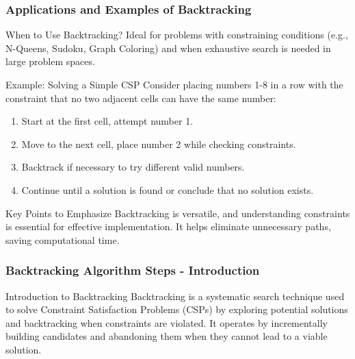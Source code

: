 \documentclass[aspectratio=169]{beamer}
\begin{document}
\begin{frame}[fragile]
    \frametitle{Applications and Examples of Backtracking}
    \begin{block}{When to Use Backtracking?}
        Ideal for problems with constraining conditions (e.g., N-Queens, Sudoku, Graph Coloring) and when exhaustive search is needed in large problem spaces.
    \end{block}
    
    \begin{block}{Example: Solving a Simple CSP}
        Consider placing numbers 1-8 in a row with the constraint that no two adjacent cells can have the same number:
        \begin{enumerate}
            \item Start at the first cell, attempt number 1.
            \item Move to the next cell, place number 2 while checking constraints.
            \item Backtrack if necessary to try different valid numbers.
            \item Continue until a solution is found or conclude that no solution exists.
        \end{enumerate}
    \end{block}
    
    \begin{block}{Key Points to Emphasize}
        Backtracking is versatile, and understanding constraints is essential for effective implementation. It helps eliminate unnecessary paths, saving computational time.
    \end{block}
\end{frame}

\begin{frame}[fragile]
    \frametitle{Backtracking Algorithm Steps - Introduction}
    \begin{block}{Introduction to Backtracking}
        Backtracking is a systematic search technique used to solve Constraint Satisfaction Problems (CSPs) by exploring potential solutions and backtracking when constraints are violated.
        It operates by incrementally building candidates and abandoning them when they cannot lead to a viable solution.
    \end{block}
\end{frame}
\end{document}
